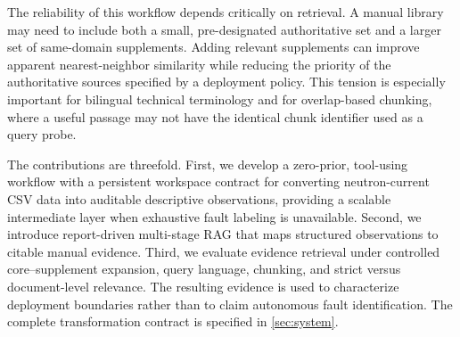 The reliability of this workflow depends critically on retrieval. A manual library may need to include both a small, pre-designated authoritative set and a larger set of same-domain supplements. Adding relevant supplements can improve apparent nearest-neighbor similarity while reducing the priority of the authoritative sources specified by a deployment policy. This tension is especially important for bilingual technical terminology and for overlap-based chunking, where a useful passage may not have the identical chunk identifier used as a query probe.

The contributions are threefold. First, we develop a zero-prior, tool-using workflow with a persistent workspace contract for converting neutron-current CSV data into auditable descriptive observations, providing a scalable intermediate layer when exhaustive fault labeling is unavailable. Second, we introduce report-driven multi-stage RAG that maps structured observations to citable manual evidence. Third, we evaluate evidence retrieval under controlled core--supplement expansion, query language, chunking, and strict versus document-level relevance. The resulting evidence is used to characterize deployment boundaries rather than to claim autonomous fault identification. The complete transformation contract is specified in \cref{sec:system}.
